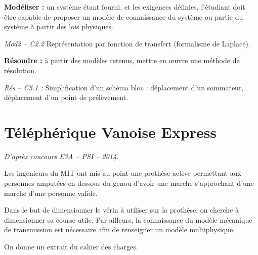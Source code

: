 \documentclass[10pt]{article}
\newif\ifprof
\begin{document}






\begin{comp}
\noindent \textbf{Modéliser :} un système étant fourni, et les exigences définies, l’étudiant doit être capable de proposer un modèle de connaissance du système ou partie du système à partir des lois physiques.

\noindent \textit{Mod2 -- C2.2} Représentation par fonction de transfert (formalisme de Laplace).

\noindent \textbf{Résoudre :} à partir des modèles retenus, mettre en œuvre une méthode de résolution.
 
\noindent \textit{Rés -- C5.1 :} Simplification d’un schéma bloc : déplacement d’un sommateur, déplacement d’un point de prélèvement.
\end{comp}

\section*{Téléphérique Vanoise Express}

\begin{flushright}
\textit{D'après concours E3A -- PSI -- 2014.}
\end{flushright}

\ifprof
\else

\begin{minipage}[c]{.8\linewidth}
Les ingénieurs du MIT ont mis au point une prothèse active permettant aux personnes amputées en dessous du genou d'avoir une marche s'approchant d'une marche d'une personne valide. 
\begin{obj} 
Dans le but de dimensionner le vérin à utiliser sur la prothèse, on cherche à dimensionner sa course utile. Par ailleurs, la connaissance du modèle mécanique de transmission est nécessaire afin de renseigner un modèle multiphysique. 
\end{obj}

 On donne un extrait du cahier des charges.
 
\end{minipage} \hfill
\begin{minipage}[c]{.15\linewidth}
\begin{center}
\end{center}
\end{minipage}
\end{document}
